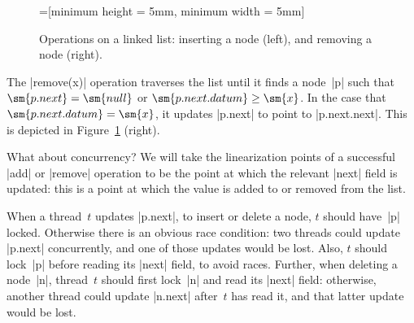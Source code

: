 \begin{figure}
\def\new{red} %
=[minimum height = 5mm, minimum width = 5mm]
\begin{center}
%
\hfil
%
\end{center}
\caption{Operations on a linked list: inserting a node (left), and removing a
  node (right).}
\label{fig:linkedlist-ops}
\end{figure}


The |remove(x)| operation traverses the list until it finds a node~|p| such
that $\sm{p.next} = \sm{null}$ or $\sm{p.next.datum} \ge \sm{x}$.  In the case
that $\sm{p.next.datum} = \sm{x}$, it updates |p.next| to point to
|p.next.next|.  This is depicted in Figure~\ref{fig:linkedlist-ops} (right).

What about concurrency?  We will take the linearization points of a successful
|add| or |remove| operation to be the point at which the relevant |next| field
is updated: this is a point at which the value is added to or removed from the list.

When a thread~$t$ updates |p.next|, to insert or delete a node, $t$ should
have~|p| locked.  Otherwise there is an obvious race condition: two threads
could update |p.next| concurrently, and one of those updates would be lost.
Also, $t$ should lock~|p| before reading its |next| field, to avoid races.
Further, when deleting a node~|n|, thread~$t$ should first lock~|n| and read
its |next| field: otherwise, another thread could update |n.next| after~$t$
has read it, and that latter update would be lost.

